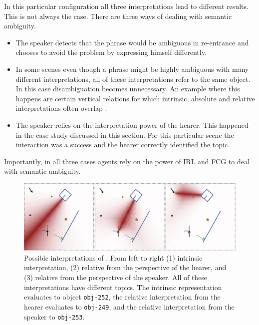 In this particular configuration all three interpretations lead 
to different results. This is not always the case. There are three 
ways of dealing with semantic ambiguity.
\begin{itemize}
\item The speaker detects that the phrase would be ambiguous in re-entrance and 
chooses to avoid the problem by expressing himself differently.
\item  In some scenes even though a phrase might be highly ambiguous with 
many different interpretations, all of these interpretations refer to the same object.
In this case disambiguation becomes unnecessary. An example where this happens
are certain vertical relations for which intrinsic, absolute and 
relative interpretations often overlap
\citep{carlson1999selecting}.
\item The speaker relies on the interpretation power of the hearer. This happened in
the case study discussed in this section. For this particular scene the interaction was
a success and the hearer correctly identified the topic.
\end{itemize}
Importantly, in all three cases agents rely on the power of IRL and FCG 
to deal with semantic ambiguity.

\begin{figure}
\begin{center}
\includegraphics[width=0.95\columnwidth]{figs/semantic-ambiguity-interpretations.png}
\end{center}
\caption[Interpretation example graphic]{Possible interpretations of .
From left to right (1) intrinsic interpretation, (2) relative from the perspective of the hearer,
and (3) relative from the perspective of the speaker. All of these interpretations have
different topics. The intrinsic representation evaluates to object {\footnotesize\tt obj-252},
the relative interpretation from the hearer evaluates to {\footnotesize\tt obj-249}, and
the relative interpretation from the speaker to {\footnotesize\tt obj-253}.}
\label{f:interpretations-1}
\end{figure}


